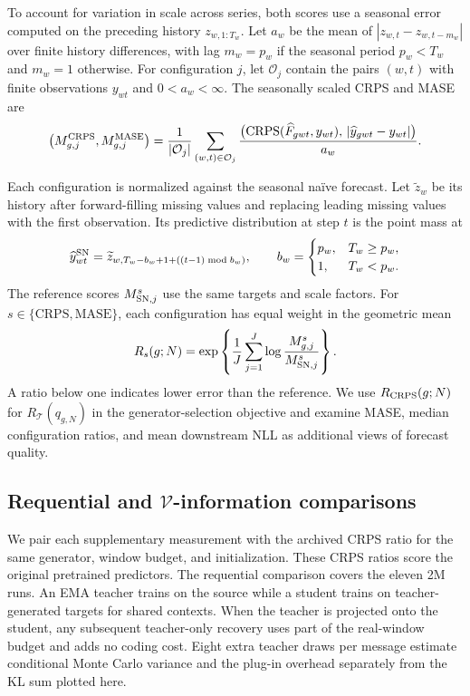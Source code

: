 \documentclass[10pt,a4paper]{article}
\theoremstyle{definition}
\begin{document}
To account for variation in scale across series, both scores use a
seasonal error computed on the preceding history $z_{w,1:T_w}$.
Let $a_w$ be the mean of $|z_{w,t}-z_{w,t-m_w}|$ over finite history
differences, with lag $m_w=p_w$ if the seasonal period $p_w<T_w$ and
$m_w=1$ otherwise. For configuration $j$, let $\mathcal O_j$ contain the
pairs $(w,t)$ with finite observations $y_{wt}$ and $0<a_w<\infty$.
The seasonally scaled CRPS and MASE~\cite{hyndman2006} are
\[
 \bigl(M^{\rm CRPS}_{g,j},M^{\rm MASE}_{g,j}\bigr)
 =\frac{1}{|\mathcal O_j|}\sum_{(w,t)\in\mathcal O_j}
 \frac{\bigl(\mathrm{CRPS}(\widehat F_{gwt},y_{wt}),\,
             |\widehat y_{gwt}-y_{wt}|\bigr)}{a_w}.
\]

Each configuration is normalized against the seasonal na\"ive forecast.
Let $\widetilde z_w$ be its history after forward-filling missing values
and replacing leading missing values with the first observation. Its
predictive distribution at step $t$ is the point mass at
\[
 \widehat y^{\rm SN}_{wt}
 =\widetilde z_{w,T_w-b_w+1+((t-1)\bmod b_w)},\qquad
 b_w=\begin{cases}p_w,&T_w\ge p_w,\\1,&T_w<p_w.\end{cases}
\]
The reference scores $M^s_{{\rm SN},j}$ use the same targets and scale
factors. For $s\in\{\mathrm{CRPS},\mathrm{MASE}\}$, each configuration
has equal weight in the geometric mean
\begin{equation}
 R_s(g;N)=\exp\left\{\frac1J\sum_{j=1}^J
 \log\frac{M^s_{g,j}}{M^s_{{\rm SN},j}}\right\}.
 \label{eq:downstream-ratio}
\end{equation}
A ratio below one indicates lower error than the reference. We use
$R_{\rm CRPS}(g;N)$ for $R_{\mathcal T}(q_{g,N})$ in the generator-selection
objective and examine MASE, median configuration ratios, and mean
downstream NLL as additional views of forecast quality.

\subsection{Requential and \texorpdfstring{$\mathcal V$}{V}-information comparisons}
\label{sec:coding-protocol}
We pair each supplementary measurement with the archived CRPS ratio for
the same generator, window budget, and initialization. These CRPS ratios
score the original pretrained predictors. The requential comparison covers
the eleven 2M runs. An EMA teacher trains on the source while a student
trains on teacher-generated targets for shared contexts. When the teacher
is projected onto the student, any subsequent teacher-only recovery uses
part of the real-window budget and adds no coding cost. Eight extra
teacher draws per message estimate conditional Monte Carlo variance and
the plug-in overhead separately from the KL sum plotted here.
\end{document}
